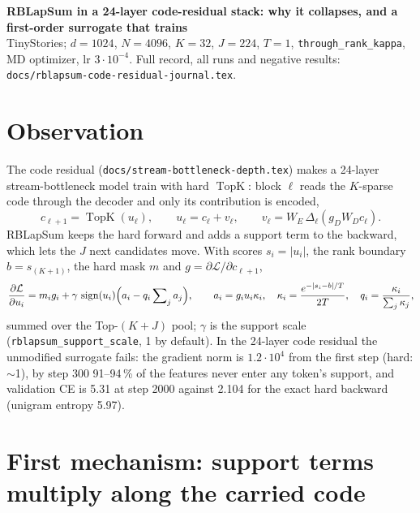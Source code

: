 \documentclass[10pt,a4paper]{article}
\newcommand{\code}[1]{\texttt{#1}}
\newcommand{\topk}{\operatorname{TopK}}
\begin{document}
{\centering
{\large\bfseries RBLapSum in a 24-layer code-residual stack: why it collapses, and a first-order surrogate that trains}\\[1pt]
{\small TinyStories; \(d=1024\), \(N=4096\), \(K=32\), \(J=224\), \(T=1\), \code{through\_rank\_kappa}, MD optimizer,
lr \(3\!\cdot\!10^{-4}\).  Full record, all runs and negative results: \code{docs/rblapsum-code-residual-journal.tex}.}\par}

\section{Observation}

The code residual (\code{docs/stream-bottleneck-depth.tex}) makes a 24-layer stream-bottleneck model train with
hard \(\topk\): block \(\ell\) reads the \(K\)-sparse code through the decoder and only its contribution is encoded,
\begin{equation*}
  c_{\ell+1}=\topk(u_\ell),\qquad u_\ell=c_\ell+v_\ell,\qquad v_\ell=W_E\,\Delta_\ell(g_DW_Dc_\ell).
\end{equation*}
RBLapSum keeps the hard forward and adds a support term to the backward, which lets the \(J\) next candidates move.
With scores \(s_i=|u_i|\), the rank boundary \(b=s_{(K+1)}\), the hard mask \(m\) and \(g=\partial\mathcal L/\partial c_{\ell+1}\),
\begin{equation}
  \frac{\partial\mathcal L}{\partial u_i}=m_ig_i+\gamma\,\operatorname{sign}(u_i)\Bigl(a_i-q_i\sum\nolimits_ja_j\Bigr),\qquad
  a_i=g_iu_i\kappa_i,\quad \kappa_i=\frac{e^{-|s_i-b|/T}}{2T},\quad q_i=\frac{\kappa_i}{\sum_j\kappa_j},
  \label{eq:rbk}
\end{equation}
summed over the Top-\((K+J)\) pool; \(\gamma\) is the support scale (\code{rblapsum\_support\_scale}, 1 by default).  In
the 24-layer code residual the unmodified surrogate fails: the gradient norm is \(1.2\cdot10^4\) from the first step
(hard: \(\sim\)1), by step 300 91--94\,\% of the features never enter any token's support, and validation CE is 5.31
at step 2000 against 2.104 for the exact hard backward (unigram entropy 5.97).

\section{First mechanism: support terms multiply along the carried code}
\end{document}
